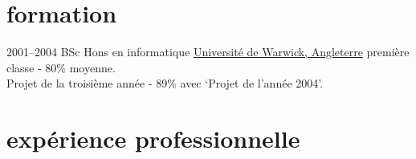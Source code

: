 \documentclass[]{friggeri-cv} %
\begin{document}
\section{formation}

\begin{entrylist}
\entry
{2001--2004}
{BSc Hons en informatique}
{\href{http://www.warwick.ac.uk}{Université de Warwick, Angleterre}}
{première classe - 80\% moyenne.\\
Projet de la troisième année - 89\% avec `Projet de l'année 2004'.}
\end{entrylist}


\section{expérience professionnelle}
\end{document}
